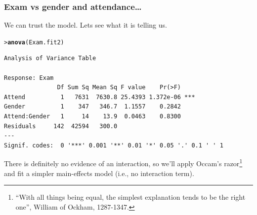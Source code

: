 \documentclass{beamer}\usepackage[]{graphicx}\usepackage[]{xcolor}
\makeatletter
\newcommand{\hlstd}[1]{\textcolor[rgb]{0.345,0.345,0.345}{#1}}%
\newcommand{\hlkwd}[1]{\textcolor[rgb]{0.737,0.353,0.396}{\textbf{#1}}}%
\newenvironment{kframe}{%
 \def\at@end@of@kframe{}%
 \ifinner\ifhmode%
  \def\at@end@of@kframe{\end{minipage}}%
  \begin{minipage}{\columnwidth}%
 \fi\fi%
 \def\FrameCommand##1{\hskip\@totalleftmargin \hskip-\fboxsep
 \colorbox{shadecolor}{##1}\hskip-\fboxsep
     \hskip-\linewidth \hskip-\@totalleftmargin \hskip\columnwidth}%
 \MakeFramed {\advance\hsize-\width
   \@totalleftmargin\z@ \linewidth\hsize
   \@setminipage}}%
 {\par\unskip\endMakeFramed%
 \at@end@of@kframe}
\newenvironment{knitrout}{}{} %
\makeatother
\begin{document}
\begin{frame}[fragile]
\frametitle{Exam vs gender and attendance\ldots}
We can trust the model. Lets see what it is telling us.
\medskip

\begin{knitrout}\scriptsize
{}\color{fgcolor}\begin{kframe}
\begin{alltt}
\hlstd{> }\hlkwd{anova}\hlstd{(Exam.fit2)}
\end{alltt}
\begin{verbatim}
Analysis of Variance Table

Response: Exam
               Df Sum Sq Mean Sq F value    Pr(>F)    
Attend          1   7631  7630.8 25.4393 1.372e-06 ***
Gender          1    347   346.7  1.1557    0.2842    
Attend:Gender   1     14    13.9  0.0463    0.8300    
Residuals     142  42594   300.0                      
---
Signif. codes:  0 '***' 0.001 '**' 0.01 '*' 0.05 '.' 0.1 ' ' 1
\end{verbatim}
\end{kframe}
\end{knitrout}
\medskip

There is definitely no evidence of an interaction, so we'll apply Occam's razor\footnote{``With all things being equal, the simplest explanation tends to be the right one'', William of Ockham, 1287-1347.} and fit a simpler main-effects model (i.e., no interaction term).
\end{frame}
\end{document}

